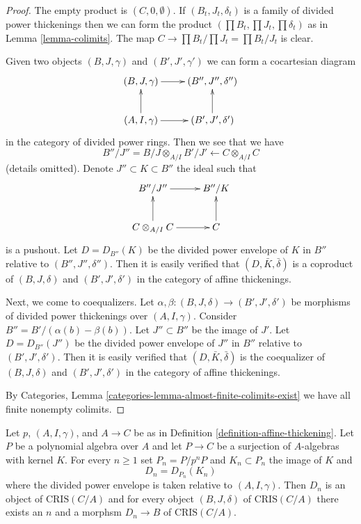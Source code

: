 \begin{proof}
The empty product is $(C, 0, \emptyset)$.
If $(B_t, J_t, \delta_t)$ is a family of divided power thickenings
then we can form the product $(\prod B_t, \prod J_t, \prod \delta_t)$
as in Lemma \ref{lemma-colimits}. The map
$C \to \prod B_t/\prod J_t = \prod B_t/J_t$ is clear.

\medskip\noindent
Given two objects $(B, J, \gamma)$ and $(B', J', \gamma')$ we can
form a cocartesian diagram
$$
\xymatrix{
(B, J, \gamma) \ar[r] & (B'', J'', \delta'') \\
(A, I, \gamma) \ar[r] \ar[u] & (B', J', \delta') \ar[u]
}
$$
in the category of divided power rings. Then we see that we have
$$
B''/J'' = B/J \otimes_{A/I} B'/J' \longleftarrow C \otimes_{A/I} C
$$ (details omitted). Denote $J'' \subset K \subset B''$ the ideal
such that
$$
\xymatrix{
B''/J'' \ar[r] & B''/K \\
C \otimes_{A/I} C \ar[r] \ar[u] & C \ar[u]
}
$$
is a pushout. Let $D = D_{B''}(K)$ be the divided power envelope of
$K$ in $B''$ relative to $(B'', J'', \delta'')$. Then it is
easily verified that $(D, \bar K, \bar \delta)$ is a coproduct
of $(B, J, \delta)$ and $(B', J', \delta')$ in the category
of affine thickenings.

\medskip\noindent
Next, we come to coequalizers. Let
$\alpha, \beta : (B, J, \delta) \to (B', J', \delta')$ be
morphisms of divided power thickenings over $(A, I, \gamma)$.
Consider $B'' = B'/ (\alpha(b) - \beta(b))$. Let $J'' \subset B''$
be the image of $J'$. Let $D = D_{B''}(J'')$ be the divided power envelope of
$J''$ in $B''$ relative to $(B', J', \delta')$. Then it is
easily verified that $(D, \bar K, \bar \delta)$ is the coequalizer
of $(B, J, \delta)$ and $(B', J', \delta')$ in the category
of affine thickenings.

\medskip\noindent
By Categories, Lemma \ref{categories-lemma-almost-finite-colimits-exist}
we have all finite nonempty colimits.
\end{proof}

\begin{lemma}
\label{lemma-set-generators}
Let $p$, $(A, I, \gamma)$, and $A \to C$ be as in
Definition \ref{definition-affine-thickening}.
Let $P$ be a polynomial algebra over $A$ and let
$P \to C$ be a surjection of $A$-algebras with kernel $K$.
For every $n \geq 1$ set $P_n = P/p^nP$ and $K_n \subset P_n$
the image of $K$ and
$$
D_n = D_{P_n}(K_n)
$$
where the divided power envelope is taken relative to $(A, I, \gamma)$.
Then $D_n$ is an object of $\text{CRIS}(C/A)$ and for every object
$(B, J, \delta)$ of $\text{CRIS}(C/A)$ there exists an $n$ and
a morphsm $D_n \to B$ of $\text{CRIS}(C/A)$.
\end{lemma}

